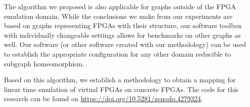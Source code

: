 The algorithm we proposed is also applicable for graphs outside of the FPGA emulation domain. While the conclusions we make from our experiments are based on graphs representing FPGAs with their structure, our software toolbox with individually changeable settings allows for benchmarks on other graphs as well. Our software (or other software created with our methodology) can be used to establish the appropriate configuration for any other domain reducible to subgraph homeomorphism.

Based on this algorithm, we establish a methodology to obtain a mapping for linear time emulation of virtual FPGAs on concrete FPGAs. The code for this research can be found on \url{https://doi.org/10.5281/zenodo.4279324}.